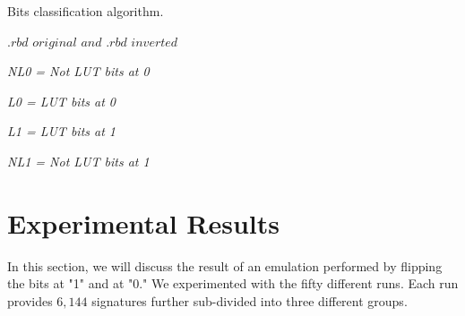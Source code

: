 \begin{algorithm}
\caption{Bits classification algorithm.}
\begin{algorithmic}
\label{BCA}
\REQUIRE $.rbd$ $original$ $and$ $.rbd$ $inverted$ \\
\vspace{0.20 cm }

\vspace{0.10 cm }

\STATE \textit{ NL0 = Not LUT bits at 0}
\vspace{0.10 cm }

\vspace{0.10 cm }

\STATE \textit{ L0 = LUT bits at 0}
\vspace{0.10 cm }

\vspace{0.10 cm }

\STATE \textit{ L1 =  LUT bits at 1}
\vspace{0.10 cm }

\vspace{0.10 cm }

\STATE \textit{ NL1 = Not LUT bits at 1}
\vspace{0.10 cm }




\ENDIF
\vspace{0.20 cm }

\end{algorithmic}
\end{algorithm}






\section{Experimental Results}
\label{Experimental Results}

In this section, we will discuss the result of an emulation performed by flipping the bits at "1" and at "0." We experimented with the fifty different runs. Each run provides $6,144$ signatures further sub-divided into three different groups. 

